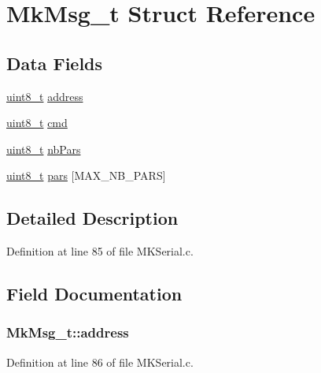\hypertarget{struct_mk_msg__t}{\section{Mk\-Msg\-\_\-t Struct Reference}
\label{struct_mk_msg__t}
}
\subsection*{Data Fields}
\begin{DoxyCompactItemize}
\item 
\hyperlink{stdint_8h_aba7bc1797add20fe3efdf37ced1182c5}{uint8\-\_\-t} \hyperlink{struct_mk_msg__t_a5959f26f7de9956138127c9b4e029658}{address}
\item 
\hyperlink{stdint_8h_aba7bc1797add20fe3efdf37ced1182c5}{uint8\-\_\-t} \hyperlink{struct_mk_msg__t_a03343f7f307a0c9df26f50ff4974daf0}{cmd}
\item 
\hyperlink{stdint_8h_aba7bc1797add20fe3efdf37ced1182c5}{uint8\-\_\-t} \hyperlink{struct_mk_msg__t_a337c996160a8982a0cb29aa03c25f676}{nb\-Pars}
\item 
\hyperlink{stdint_8h_aba7bc1797add20fe3efdf37ced1182c5}{uint8\-\_\-t} \hyperlink{struct_mk_msg__t_a8109c60d8ae790fa37e43d2e3d379a01}{pars} \mbox{[}M\-A\-X\-\_\-\-N\-B\-\_\-\-P\-A\-R\-S\mbox{]}
\end{DoxyCompactItemize}


\subsection{Detailed Description}


Definition at line 85 of file M\-K\-Serial.\-c.



\subsection{Field Documentation}
\hypertarget{struct_mk_msg__t_a5959f26f7de9956138127c9b4e029658}{
\subsubsection[{address}]{ Mk\-Msg\-\_\-t\-::address}}\label{struct_mk_msg__t_a5959f26f7de9956138127c9b4e029658}


Definition at line 86 of file M\-K\-Serial.\-c.

